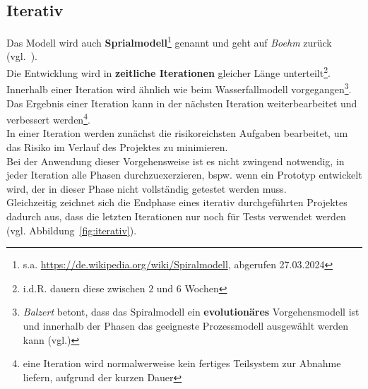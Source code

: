 
\subsection{Iterativ}

Das Modell wird auch \textbf{Sprialmodell}\footnote{
    s.a. \url{https://de.wikipedia.org/wiki/Spiralmodell}, abgerufen 27.03.2024
} genannt und geht auf \textit{Boehm} zurück (vgl.~\cite[]{Boe88}).\\

\noindent
Die Entwicklung wird in \textbf{zeitliche Iterationen} gleicher Länge unterteilt\footnote{
    i.d.R. dauern diese zwischen $2$ und $6$ Wochen
}.\\
Innerhalb einer Iteration wird ähnlich wie beim Wasserfallmodell vorgegangen\footnote{
\textit{Balzert} betont, dass das Spiralmodell ein \textbf{evolutionäres} Vorgehensmodell ist und innerhalb der Phasen das geeigneste Prozessmodell ausgewählt werden kann (vgl.\cite[556]{Bal08})
}.\\
Das Ergebnis einer Iteration kann in der nächsten Iteration weiterbearbeitet und verbessert werden\footnote{
    eine Iteration wird normalwerweise kein fertiges Teilsystem zur Abnahme liefern, aufgrund der kurzen Dauer
}.\\
In einer Iteration werden zunächst die risikoreichsten Aufgaben bearbeitet, um das Risiko im Verlauf des Projektes zu minimieren.\\

\noindent
Bei der Anwendung dieser Vorgehensweise ist es nicht zwingend notwendig, in jeder Iteration alle Phasen  durchzuexerzieren, bspw. wenn ein Prototyp entwickelt wird, der in dieser Phase nicht vollständig getestet werden muss.\\
Gleichzeitig zeichnet sich die Endphase eines iterativ durchgeführten Projektes dadurch aus, dass die letzten Iterationen nur noch für Tests verwendet werden (vgl. Abbildung~\ref{fig:iterativ}).

